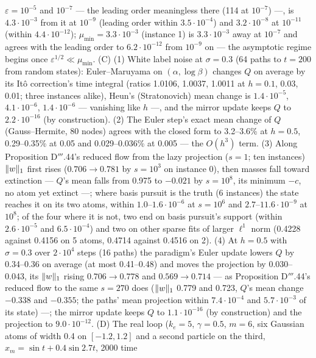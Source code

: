 \begin{sloppypar}
$\varepsilon = 10^{-5}$ and $10^{-7}$ --- the leading order meaningless there (114 at $10^{-7}$) ---, is
$4.3\cdot10^{-3}$ from it at $10^{-9}$ (leading order within $3.5\cdot10^{-4}$) and $3.2\cdot10^{-8}$ at $10^{-11}$
(within $4.4\cdot10^{-12}$); $\mu_{\min} = 3.3\cdot10^{-3}$ (instance 1) is $3.3\cdot10^{-3}$ away at $10^{-7}$ and
agrees with the leading order to $6.2\cdot10^{-12}$ from $10^{-9}$ on --- the asymptotic regime begins once
$\varepsilon^{1/2}\ll\mu_{\min}$. (C) (1) White label noise at $\sigma = 0.3$ (64 paths to $t = 200$ from random
states): Euler--Maruyama on $(\alpha,\log\beta)$ changes $Q$ on average by its It\^o correction's time integral (ratios
1.0106, 1.0037, 1.0011 at $h = 0.1$, 0.03, 0.01; three instances alike), Heun's (Stratonovich) mean change is
$1.4\cdot10^{-5}$, $4.1\cdot10^{-6}$, $1.4\cdot10^{-6}$ --- vanishing like $h$ ---, and the mirror update keeps $Q$ to
$2.2\cdot10^{-16}$ (by construction). (2) The Euler step's exact mean change of $Q$ (Gauss--Hermite, 80 nodes) agrees
with the closed form to 3.2--3.6\% at $h = 0.5$, 0.29--0.35\% at 0.05 and 0.029--0.036\% at 0.005 --- the $O(h^3)$
term. (3) Along Proposition D$'''$.44's reduced flow from the lazy projection ($s = 1$; ten instances) $\lVert w\rVert_1$ first
rises ($0.706\to0.781$ by $s = 10^3$ on instance 0), then masses fall toward extinction --- $Q$'s mean falls from 0.975
to $-0.021$ by $s = 10^8$, its minimum $-c$, no atom yet extinct ---; where basis pursuit is the truth (6 instances) the
state reaches it on its two atoms, within $1.0$--$1.6\cdot10^{-6}$ at $s = 10^6$ and $2.7$--$11.6\cdot10^{-9}$ at
$10^8$; of the four where it is not, two end on basis pursuit's support (within $2.6\cdot10^{-5}$ and
$6.5\cdot10^{-4}$) and two on other sparse fits of larger $\ell^1$ norm (0.4228 against 0.4156 on 5 atoms, 0.4714
against 0.4516 on 2). (4) At $h = 0.5$ with $\sigma = 0.3$ over $2\cdot10^4$ steps (16 paths) the paradigm's Euler
update lowers $Q$ by 0.34--0.36 on average (at most 0.41--0.48) and moves the projection by 0.030--0.043, its
$\lVert w\rVert_1$ rising $0.706\to0.778$ and $0.569\to0.714$ --- as Proposition D$'''$.44's reduced flow to the same
$s = 270$ does ($\lVert w\rVert_1$ 0.779 and 0.723, $Q$'s mean change $-0.338$ and $-0.355$; the paths' mean projection within
$7.4\cdot10^{-4}$ and $5.7\cdot10^{-3}$ of its state) ---; the mirror update keeps $Q$ to $1.1\cdot10^{-16}$ (by
construction) and the projection to $9.0\cdot10^{-12}$. (D) The real loop ($k_e = 5$, $\gamma = 0.5$, $m = 6$, six
Gaussian atoms of width 0.4 on $[-1.2,1.2]$ and a second particle on the third, $x_m = \sin t + 0.4\sin2.7t$, 2000 time

\end{sloppypar}
